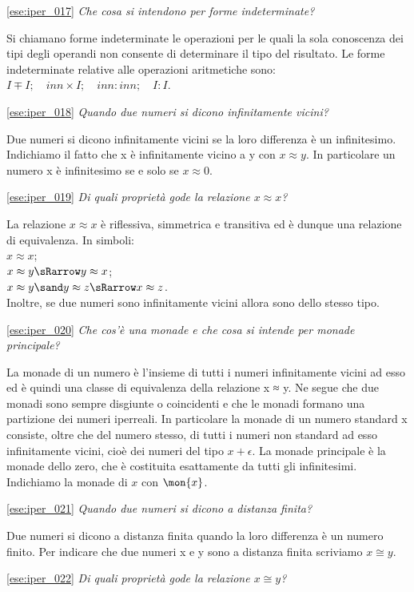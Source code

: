 \ref{ese:iper_017} 
\emph{Che cosa si intendono per forme indeterminate?}

Si chiamano forme indeterminate le operazioni per le quali la sola conoscenza 
dei tipi degli operandi non consente di determinare il tipo del risultato. Le 
forme indeterminate relative alle operazioni aritmetiche sono:
\(I \mp I; \quad inn \times I; \quad inn : inn; \quad I : I\).

\ref{ese:iper_018} 
\emph{Quando due numeri si dicono infinitamente vicini?}

Due numeri si dicono infinitamente vicini se la loro differenza è un 
infinitesimo. Indichiamo il fatto che x è infinitamente vicino a y con 
\(x \approx y\). 
In particolare un numero x è infinitesimo se e solo se \(x \approx 0\).

\ref{ese:iper_019} 
\emph{Di quali proprietà gode la relazione \(x \approx x\)?}

La relazione \(x \approx x\) è riflessiva, simmetrica e transitiva ed è dunque 
una relazione di equivalenza. In simboli:\\
\(x \approx x\);\\
\(x \approx y \sRarrow y \approx x\);\\
\(x \approx y \sand y \approx z \sRarrow x \approx z\).\\
Inoltre, se due numeri sono infinitamente vicini allora sono dello stesso tipo.

\ref{ese:iper_020} 
\emph{Che cos'è una monade e che cosa si intende per monade principale?}

La monade di un numero è l'insieme di tutti i numeri infinitamente vicini ad 
esso ed è quindi una classe di equivalenza della relazione x ≈ y. Ne segue che 
due monadi sono sempre disgiunte o coincidenti e che le monadi formano una 
partizione dei numeri iperreali. In particolare la monade di un numero standard 
x consiste, oltre che del numero stesso, di tutti i numeri non standard ad esso 
infinitamente vicini, cioè dei numeri del tipo \(x + \epsilon\). La monade 
principale è la monade dello zero, che è costituita esattamente da tutti gli 
infinitesimi. Indichiamo la monade di \(x\) con \(\mon{x}\).

\ref{ese:iper_021} 
\emph{Quando due numeri si dicono a distanza finita?}

Due numeri si dicono a distanza finita quando la loro differenza è un numero 
finito. 
Per indicare che due numeri x e y sono a distanza finita scriviamo 
\(x \cong y\).

\ref{ese:iper_022} 
\emph{Di quali proprietà gode la relazione \(x \cong y\)?}

